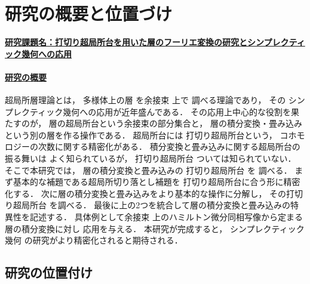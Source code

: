 \documentclass[11pt,a4paper,uplatex,dvipdfmx]{ujarticle} 		%
\newcommand{\研究課題名}{打切り超局所台を用いた層のフーリエ変換の研究とシンプレクティック幾何への応用}
\newcommand{\研究機関名}{北海道大学}
\newcommand{\研究代表者氏名}{大柴寿浩}
\begin{document}

\section{研究の概要と位置づけ}

\vspace{-8pt}
\noindent
\underline{\textbf{研究課題名：\研究課題名}}
\vspace{-12pt}

\paragraph*{\underline{研究の概要}}
超局所層理論とは，
多様体上の層
を余接束
上で
調べる理論であり，
その
シンプレクティック幾何への応用が近年盛んである．
その応用上中心的な役割を果たすのが，
層の超局所台という余接束の部分集合と，
層の積分変換・畳み込みという別の層を作る操作である．
超局所台には
打切り超局所台という，
コホモロジーの次数に関する精密化がある．
積分変換と畳み込みに関する超局所台の振る舞いは
よく知られているが，
打切り超局所台
ついては知られていない．
そこで本研究では，
層の積分変換と畳み込みの
打切り超局所台
を
調べる．
まず基本的な補題である超局所切り落とし補題を
打切り超局所台に合う形に精密化する．
次に層の積分変換と畳み込みをより基本的な操作に分解し，
その打切り超局所台
を調べる．
最後に上の2つを統合して層の積分変換と畳み込みの特異性を記述する．
具体例として余接束
上のハミルトン微分同相写像から定まる層の積分変換に対し
応用を与える．
本研究が完成すると，
シンプレクティック幾何
の研究がより精密化されると期待される．


\vspace{-22pt}
\subsection*{研究の位置付け}
\vspace{-8pt}
\end{document}

